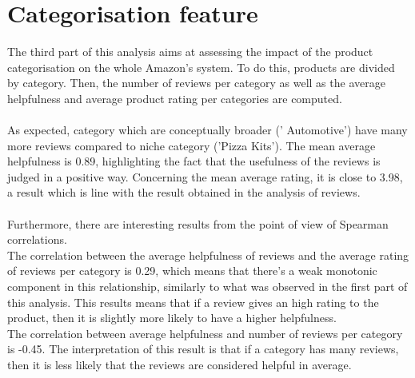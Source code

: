 \documentclass[11pt]{article}
\begin{document}
\section{Categorisation feature}
The third part of this analysis aims at assessing the impact of the product categorisation on the whole Amazon's system. To do this, products are divided by category. Then, the number of reviews per category as well as the average helpfulness and average product rating per categories are computed.\\\\
As expected, category which are conceptually broader (' Automotive') have many more reviews compared to niche category ('Pizza Kits'). The mean average helpfulness is 0.89, highlighting the fact that the usefulness of the reviews is judged in a positive way. Concerning the mean average rating, it is close to 3.98, a result which is line with the result obtained in the analysis of reviews.\\\\
Furthermore, there are interesting results from the point of view of Spearman correlations.\\
The correlation between the average helpfulness of reviews and the average rating of reviews per category is 0.29, which means that there's a weak monotonic component in this relationship, similarly to what was observed in the first part of this analysis. This results means that if a review gives an high rating to the product, then it is slightly more likely to have a higher helpfulness.  \\
The correlation between average helpfulness and number of reviews per category is -0.45. The interpretation of this result is that if a category has many reviews, then it is less likely that the reviews are considered helpful in average. \\
\end{document}
